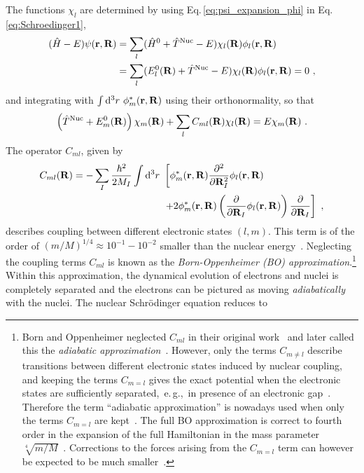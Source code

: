 The functions $\chi_l$ are determined by using Eq.\,\eqref{eq:psi_expansion_phi} in Eq.\,\eqref{eq:Schroedinger1},
\begin{align}
    (\hat{H} - E) \psi ({\bf r}, {\bf R})
        & = \sum_l (\hat{H}^0 + \hat{T}^{\rm Nuc} - E) \chi_l ({\bf R}) \phi_l ({\bf r}, {\bf R}) \nonumber \\
        &= \sum_l (E^0_l({\bf R}) + \hat{T}^{\rm Nuc} - E) \chi_l ({\bf R}) \phi_l ({\bf r}, {\bf R}) = 0~,
\end{align}
and integrating with $\int {\rm d}^3 r ~ \phi^\ast_m ({\bf r}, {\bf R})$ using their orthonormality, so that
\begin{align}
    \left( \hat{T}^{\rm Nuc} + E^0_m({\bf R}) \right) \chi_m ({\bf R})
        + \sum_l C_{ml} ({\bf R}) \chi_l ({\bf R})
        = E \chi_m ({\bf R})~.
    \label{eq:chi1}
\end{align}
The operator $C_{ml}$, given by
\begin{align}
    C_{ml} ({\bf R})
        = - \sum_I \frac{\hbar^2}{2 M_I} \int \d^3 r ~ 
        &\left[ \phi^\ast_m ({\bf r}, {\bf R}) \frac{\partial^2}{\partial {\bf R}_I^2}
            \phi_l ({\bf r}, {\bf R}) \right. \nonumber \\
        &\left.
            + 2 \phi^\ast_m ({\bf r}, {\bf R}) \left(
                \frac{\partial}{\partial {\bf R}_I} \phi_l ({\bf r}, {\bf R}) \right)
            \frac{\partial}{\partial {\bf R}_I}
        \right]~,
    \label{eq:Aml}
\end{align}
describes coupling between different electronic states $(l, m)$. This term is of the order of $(m/M)^{1/4} \approx 10^{-1} - 10^{-2}$ smaller than the nuclear energy~\cite{BornOppenheimer}. Neglecting the coupling terms $C_{ml}$ is known as the \emph{Born-Oppenheimer (BO) approximation}.\footnote[][0em]{Born and Oppenheimer neglected $C_{ml}$ in their original work~\cite{BornOppenheimer} and later called this the \emph{adiabatic approximation}~\cite{BornHuang}. However, only the terms $C_{m \neq l}$ describe transitions between different electronic states induced by nuclear coupling, and keeping the terms $C_{m=l}$ gives the exact potential when the electronic states are sufficiently separated,~e.\,g.,~in presence of an electronic gap~\cite{Born1951kopplung}. Therefore the term ``adiabatic approximation'' is nowadays used when only the terms $C_{m=l}$ are kept~\cite{Marx2009}. The full BO approximation is correct to fourth order in the expansion of the full Hamiltonian in the mass parameter $\sqrt[4]{m/M}$~\cite{BornHuang}. Corrections to the forces arising from the $C_{m=l}$ term can however be expected to be much smaller~\cite{Ziman1955}.
} Within this approximation, the dynamical evolution of electrons and nuclei is completely separated and the electrons can be pictured as moving \emph{adiabatically} with the nuclei. The nuclear Schr\"odinger equation reduces to
